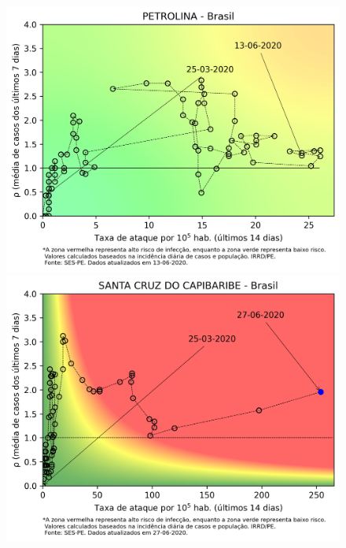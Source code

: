 \documentclass[]{article}
\begin{document}
\newpage
\begin{figure}[!h]
	\centering
	\begin{minipage}[t]{4cm}
		\centering
		\includegraphics[scale=0.5]{../PETROLINA.png}
	\end{minipage}
	\hspace{5cm}
	\begin{minipage}[t]{4cm}
		\centering
		\includegraphics[scale=0.5]{../SANTACRUZDOCAPIBARIBE.png}
		\vspace{0.2cm}
	\end{minipage}
	

\end{figure}
\end{document}
